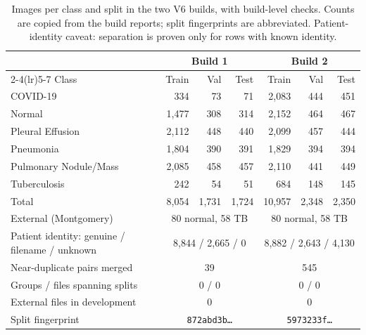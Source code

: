\documentclass[12pt]{article}
\begin{document}
\begin{table}[ht]
\centering
\caption{Images per class and split in the two V6 builds, with build-level checks. Counts are copied from the build reports; split fingerprints are abbreviated. Patient-identity caveat: separation is proven only for rows with known identity.}
\label{tab:builds}
\small
\begin{tabular}{@{}lrrrrrr@{}}
\toprule
 & \multicolumn{3}{c}{Build 1} & \multicolumn{3}{c}{Build 2} \\
\cmidrule(lr){2-4}\cmidrule(lr){5-7}
Class & Train & Val & Test & Train & Val & Test \\
\midrule
COVID-19                & 334   & 73    & 71    & 2,083  & 444   & 451 \\
Normal                  & 1,477 & 308   & 314   & 2,152  & 464   & 467 \\
Pleural Effusion        & 2,112 & 448   & 440   & 2,099  & 457   & 444 \\
Pneumonia               & 1,804 & 390   & 391   & 1,829  & 394   & 394 \\
Pulmonary Nodule/Mass   & 2,085 & 458   & 457   & 2,110  & 441   & 449 \\
Tuberculosis            & 242   & 54    & 51    & 684    & 148   & 145 \\
\midrule
Total                   & 8,054 & 1,731 & 1,724 & 10,957 & 2,348 & 2,350 \\
\midrule
External (Montgomery)   & \multicolumn{3}{c}{80 normal, 58 TB} & \multicolumn{3}{c}{80 normal, 58 TB} \\
Patient identity: genuine / filename / unknown & \multicolumn{3}{c}{8,844 / 2,665 / 0} & \multicolumn{3}{c}{8,882 / 2,643 / 4,130} \\
Near-duplicate pairs merged & \multicolumn{3}{c}{39} & \multicolumn{3}{c}{545} \\
Groups / files spanning splits & \multicolumn{3}{c}{0 / 0} & \multicolumn{3}{c}{0 / 0} \\
External files in development & \multicolumn{3}{c}{0} & \multicolumn{3}{c}{0} \\
Split fingerprint & \multicolumn{3}{c}{\texttt{872abd3b\ldots}} & \multicolumn{3}{c}{\texttt{5973233f\ldots}} \\
\bottomrule
\end{tabular}
\end{table}
\end{document}
